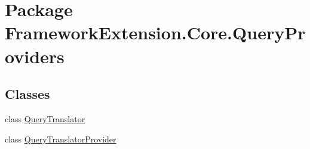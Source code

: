 \hypertarget{namespace_framework_extension_1_1_core_1_1_query_providers}{\section{Package Framework\-Extension.\-Core.\-Query\-Providers}
\label{namespace_framework_extension_1_1_core_1_1_query_providers}
}
\subsection*{Classes}
\begin{DoxyCompactItemize}
\item 
class \hyperlink{class_framework_extension_1_1_core_1_1_query_providers_1_1_query_translator-g}{Query\-Translator}
\item 
class \hyperlink{class_framework_extension_1_1_core_1_1_query_providers_1_1_query_translator_provider-g}{Query\-Translator\-Provider}
\end{DoxyCompactItemize}
